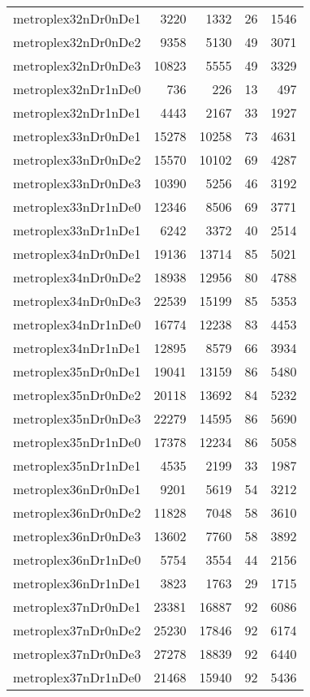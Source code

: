 \begin{longtable}{lrrrr}
metroplex32nDr0nDe1 & 3220 & 1332 & 26 & 1546 \\
metroplex32nDr0nDe2 & 9358 & 5130 & 49 & 3071 \\
metroplex32nDr0nDe3 & 10823 & 5555 & 49 & 3329 \\
metroplex32nDr1nDe0 & 736 & 226 & 13 & 497 \\
metroplex32nDr1nDe1 & 4443 & 2167 & 33 & 1927 \\
metroplex33nDr0nDe1 & 15278 & 10258 & 73 & 4631 \\
metroplex33nDr0nDe2 & 15570 & 10102 & 69 & 4287 \\
metroplex33nDr0nDe3 & 10390 & 5256 & 46 & 3192 \\
metroplex33nDr1nDe0 & 12346 & 8506 & 69 & 3771 \\
metroplex33nDr1nDe1 & 6242 & 3372 & 40 & 2514 \\
metroplex34nDr0nDe1 & 19136 & 13714 & 85 & 5021 \\
metroplex34nDr0nDe2 & 18938 & 12956 & 80 & 4788 \\
metroplex34nDr0nDe3 & 22539 & 15199 & 85 & 5353 \\
metroplex34nDr1nDe0 & 16774 & 12238 & 83 & 4453 \\
metroplex34nDr1nDe1 & 12895 & 8579 & 66 & 3934 \\
metroplex35nDr0nDe1 & 19041 & 13159 & 86 & 5480 \\
metroplex35nDr0nDe2 & 20118 & 13692 & 84 & 5232 \\
metroplex35nDr0nDe3 & 22279 & 14595 & 86 & 5690 \\
metroplex35nDr1nDe0 & 17378 & 12234 & 86 & 5058 \\
metroplex35nDr1nDe1 & 4535 & 2199 & 33 & 1987 \\
metroplex36nDr0nDe1 & 9201 & 5619 & 54 & 3212 \\
metroplex36nDr0nDe2 & 11828 & 7048 & 58 & 3610 \\
metroplex36nDr0nDe3 & 13602 & 7760 & 58 & 3892 \\
metroplex36nDr1nDe0 & 5754 & 3554 & 44 & 2156 \\
metroplex36nDr1nDe1 & 3823 & 1763 & 29 & 1715 \\
metroplex37nDr0nDe1 & 23381 & 16887 & 92 & 6086 \\
metroplex37nDr0nDe2 & 25230 & 17846 & 92 & 6174 \\
metroplex37nDr0nDe3 & 27278 & 18839 & 92 & 6440 \\
metroplex37nDr1nDe0 & 21468 & 15940 & 92 & 5436 \\

\end{longtable}
